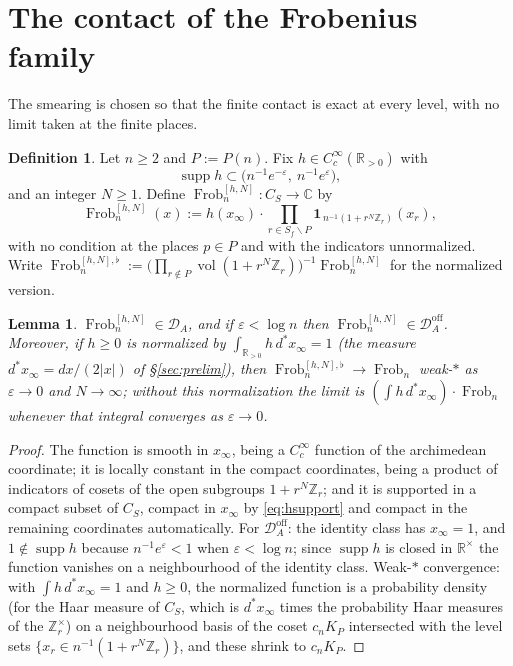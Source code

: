 \documentclass[11pt]{amsart}
\newtheorem{lemma}[theorem]{Lemma}
\theoremstyle{definition}
\newtheorem{definition}[theorem]{Definition}
\theoremstyle{remark}
\newcommand{\C}{\mathbb C}
\newcommand{\R}{\mathbb R}
\newcommand{\Z}{\mathbb Z}
\newcommand{\Frob}{\operatorname{Frob}}
\newcommand{\supp}{\operatorname{supp}}
\newcommand{\vol}{\operatorname{vol}}
\newcommand{\DA}{\mathcal D_A}
\newcommand{\Doff}{\mathcal D_A^{\mathrm{off}}}
\begin{document}
\section{The contact of the Frobenius family}\label{sec:frobcontact}

The smearing is chosen so that the finite contact is exact at every level, with
no limit taken at the finite places.

\begin{definition}\label{def:smearedfrob}
Let $n\ge2$ and $P:=P(n)$. Fix $h\in C_c^\infty(\R_{>0})$ with
\begin{equation}\label{eq:hsupport}
  \supp h\subset\bigl(n^{-1}e^{-\varepsilon},\ n^{-1}e^{\varepsilon}\bigr),
\end{equation}
and an integer $N\ge1$. Define $\Frob_n^{[h,N]}:C_S\to\C$ by
\begin{equation}\label{eq:smearedfrob}
  \Frob_n^{[h,N]}(x):=h(x_\infty)\cdot\prod_{r\in S_f\smallsetminus P}
   \mathbf 1_{\,n^{-1}(1+r^N\Z_r)}(x_r),
\end{equation}
with no condition at the places $p\in P$ and with the indicators
unnormalized. Write $\Frob_n^{[h,N],\flat}:=\bigl(\prod_{r\notin P}
\vol(1+r^N\Z_r)\bigr)^{-1}\Frob_n^{[h,N]}$ for the normalized version.
\end{definition}

\begin{lemma}\label{lem:smearedfrobinDA}
$\Frob_n^{[h,N]}\in\DA$, and if $\varepsilon<\log n$ then
$\Frob_n^{[h,N]}\in\Doff$. Moreover, if $h\ge0$ is normalized by $\int_{\R_{>0}}h\,d^*x_\infty=1$
(the measure $d^*x_\infty=dx/(2|x|)$ of \S\ref{sec:prelim}), then
$\Frob_n^{[h,N],\flat}\to\Frob_n$ weak-$*$ as $\varepsilon\to0$ and
$N\to\infty$; without this normalization the limit is
$(\int h\,d^*x_\infty)\cdot\Frob_n$ whenever that integral converges as
$\varepsilon\to0$.
\end{lemma}

\begin{proof}
The function is smooth in $x_\infty$, being a $C_c^\infty$ function of the
archimedean coordinate; it is locally constant in the compact coordinates,
being a product of indicators of cosets of the open subgroups $1+r^N\Z_r$; and
it is supported in a compact subset of $C_S$, compact in $x_\infty$ by
\eqref{eq:hsupport} and compact in the remaining coordinates automatically. For
$\Doff$: the identity class has $x_\infty=1$, and $1\notin\supp h$ because
$n^{-1}e^\varepsilon<1$ when $\varepsilon<\log n$; since $\supp h$ is closed in
$\R^\times$ the function vanishes on a neighbourhood of the identity class.
Weak-$*$ convergence: with $\int h\,d^*x_\infty=1$ and $h\ge0$, the
normalized function is a probability density (for the Haar measure of $C_S$,
which is $d^*x_\infty$ times the probability Haar measures of the
$\Z_r^\times$) on a
neighbourhood basis of the coset $c_nK_P$ intersected with the level sets
$\{x_r\in n^{-1}(1+r^N\Z_r)\}$, and these shrink to $c_nK_P$.
\end{proof}
\end{document}
